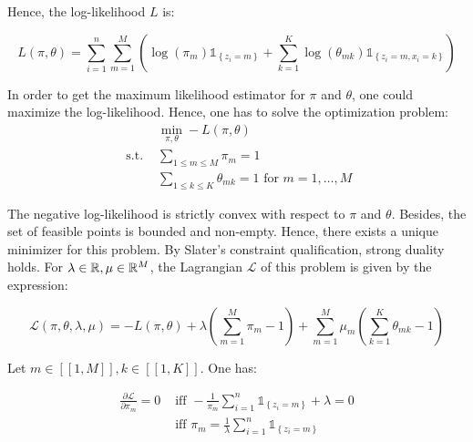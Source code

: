 \documentclass[a4paper, 11pt]{report}
\begin{document}
Hence, the log-likelihood $L$ is:

\begin{equation*}
    L \left( \pi, \theta \right) = \sum_{i=1}^{n} \sum_{m=1}^{M} \left( \log(\pi_m) \mathds{1}_{\left\{ z_i = m \right\}} + \sum_{k=1}^{K} \log(\theta_{mk}) \mathds{1}_{\left\{ z_i = m, x_i = k \right\}} \right)
\end{equation*}
\vspace*{.6em}

In order to get the maximum likelihood estimator for $\pi$ and $\theta$, one could maximize the log-likelihood. Hence, one has to solve the optimization problem: \\

\begin{equation*}
    \begin{aligned}
    & \min_{\pi, \theta} - L \left( \pi, \theta \right) \\
    \text{ s.t. } & \sum_{1 \leq m \leq M} \pi_{m} = 1 \\
    & \sum_{1 \leq k \leq K} \theta_{mk} = 1 \text{ for } m = 1, \dots, M
    \end{aligned}
\end{equation*}
\vspace*{.9em}

The negative log-likelihood is strictly convex with respect to $\pi$ and $\theta$. Besides, the set of feasible points is bounded and non-empty. Hence, there exists a unique minimizer for this problem. By Slater's constraint qualification, strong duality holds. For $\lambda \in \mathbb{R}, \mu \in \mathbb{R}^{M}$, the Lagrangian $\mathcal{L}$ of this problem is given by the expression:

\begin{equation*}
    \mathcal{L} \left( \pi, \theta, \lambda, \mu \right) = - L \left( \pi, \theta \right) + \lambda \left( \sum_{m=1}^{M} \pi_{m} - 1 \right) + \sum_{m=1}^{M} \mu_{m} \left( \sum_{k=1}^{K} \theta_{mk} - 1 \right)
\end{equation*}
\vspace*{.6em}

Let $m \in [\![ 1, M ]\!], k \in [\![ 1, K ]\!]$. One has:

\begin{equation*}
    \begin{aligned}
    \frac{\partial \mathcal{L}}{\partial \pi_{m}} = 0 &\text{ iff } - \frac{1}{\pi_m} \sum_{i=1}^{n} \mathds{1}_{\left\{ z_i = m \right\}} + \lambda = 0 \\
    &\text{ iff } \pi_m = \frac{1}{\lambda} \sum_{i=1}^{n} \mathds{1}_{\left\{ z_i = m \right\}}
    \end{aligned}
\end{equation*}
\end{document}

